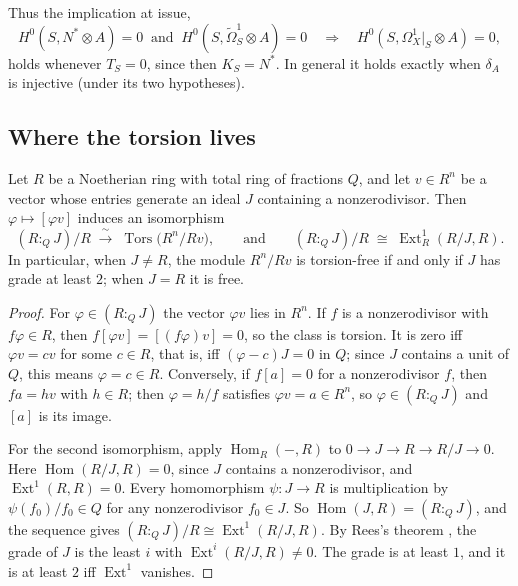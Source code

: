 Thus the implication at issue,
\[
H^0(S,N^*\otimes A)=0\ \text{ and }\ H^0(S,\widetilde\Omega^1_S\otimes A)=0\quad\Longrightarrow\quad H^0(S,\Omega^1_X|_S\otimes A)=0,
\]
holds whenever $T_S=0$, since then $K_S=N^*$. In general it holds exactly when $\delta_A$ is injective (under its two hypotheses).

\subsection{Where the torsion lives}

\begin{lemma}\label{lem:onerel}
Let $R$ be a Noetherian ring with total ring of fractions $Q$, and let $v\in R^n$ be a vector whose entries generate an ideal $J$ containing a nonzerodivisor. Then $\varphi\mapsto[\varphi v]$ induces an isomorphism
\[
(R:_QJ)/R\;\xrightarrow{\ \sim\ }\;\operatorname{Tors}\bigl(R^n/Rv\bigr),\qquad\text{and}\qquad (R:_QJ)/R\;\cong\;\operatorname{Ext}^1_R(R/J,R).
\]
In particular, when $J\neq R$, the module $R^n/Rv$ is torsion-free if and only if $J$ has grade at least $2$; when $J=R$ it is free.
\end{lemma}

\begin{proof}
For $\varphi\in(R:_QJ)$ the vector $\varphi v$ lies in $R^n$. If $f$ is a nonzerodivisor with $f\varphi\in R$, then $f[\varphi v]=[(f\varphi)v]=0$, so the class is torsion. It is zero iff $\varphi v=cv$ for some $c\in R$, that is, iff $(\varphi-c)J=0$ in $Q$; since $J$ contains a unit of $Q$, this means $\varphi=c\in R$. Conversely, if $f[a]=0$ for a nonzerodivisor $f$, then $fa=hv$ with $h\in R$; then $\varphi=h/f$ satisfies $\varphi v=a\in R^n$, so $\varphi\in(R:_QJ)$ and $[a]$ is its image.

For the second isomorphism, apply $\operatorname{Hom}_R(-,R)$ to $0\to J\to R\to R/J\to0$. Here $\operatorname{Hom}(R/J,R)=0$, since $J$ contains a nonzerodivisor, and $\operatorname{Ext}^1(R,R)=0$. Every homomorphism $\psi:J\to R$ is multiplication by $\psi(f_0)/f_0\in Q$ for any nonzerodivisor $f_0\in J$. So $\operatorname{Hom}(J,R)=(R:_QJ)$, and the sequence gives $(R:_QJ)/R\cong\operatorname{Ext}^1(R/J,R)$. By Rees's theorem \cite[Thm.~16.6]{Mat86}, the grade of $J$ is the least $i$ with $\operatorname{Ext}^i(R/J,R)\neq0$. The grade is at least $1$, and it is at least $2$ iff $\operatorname{Ext}^1$ vanishes.
\end{proof}


